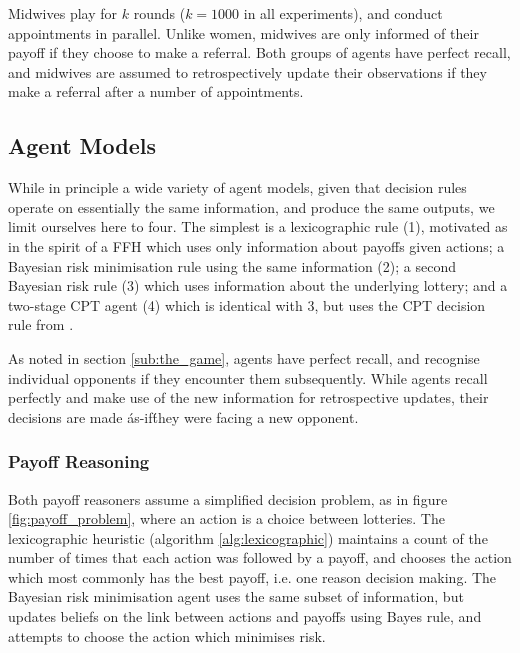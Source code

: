 Midwives play for \(k\) rounds (\(k=1000\) in all experiments), and conduct appointments in parallel. Unlike women, midwives are only informed of their payoff if they choose to make a referral. Both groups of agents have perfect recall, and midwives are assumed to retrospectively update their observations if they make a referral after a number of appointments.


\subsection{Agent Models}
\label{sub:the_agents}

While in principle a wide variety of agent models, given that decision rules operate on essentially the same information, and produce the same outputs, we limit ourselves here to four. The simplest is a lexicographic rule (1), motivated as in the spirit of a \ac{FFH} \citep{Gigerenzer2004} which uses only information about payoffs given actions; a Bayesian risk minimisation rule using the same information (2); a second Bayesian risk rule (3) which uses information about the underlying lottery; and a two-stage \ac{CPT} \cite{Hau2008} agent (4) which is identical with 3, but uses the \ac{CPT} decision rule from \cite{Tversky1992}.

As noted in section \ref{sub:the_game}, agents have perfect recall, and recognise individual opponents if they encounter them subsequently. While agents recall perfectly and make use of the new information for retrospective updates, their decisions are made \'as-if\' they were facing a new opponent.

\subsubsection{Payoff Reasoning}

Both payoff reasoners assume a simplified decision problem, as in figure \ref{fig:payoff_problem}, where an action is a choice between lotteries. The lexicographic heuristic (algorithm \ref{alg:lexicographic}) maintains a count of the number of times that each action was followed by a payoff, and chooses the action which most commonly has the best payoff, i.e. one reason decision making. The Bayesian risk minimisation agent uses the same subset of information, but updates beliefs on the link between actions and payoffs using Bayes rule, and attempts to choose the action which minimises risk.


